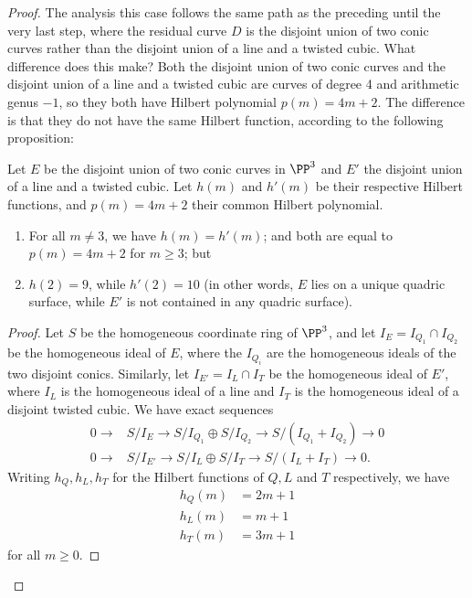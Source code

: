 \begin{proof}

The analysis this case follows the same path as the preceding until the very last step, where the residual curve $D$ is the disjoint union of two conic curves rather than the disjoint union of a line and a twisted cubic. What difference does this make? Both the disjoint union of two conic curves and the disjoint union of a line and a twisted cubic are curves of degree 4 and arithmetic genus $-1$, so they both have Hilbert polynomial $p(m) = 4m+2$. The difference is that they do not have the same Hilbert function, according to the following proposition:

\begin{proposition}\label{quartic curve postulation}
Let $E$ be the  disjoint union of two conic curves in $\PP^3$ and $E'$ the disjoint union of a line and a twisted cubic. Let $h(m)$ and $h'(m)$ be their respective Hilbert functions, and $p(m) = 4m+2$ their common Hilbert polynomial.
\begin{enumerate}
\item For all $m \neq 3$, we have $h(m) = h'(m)$; and both are equal to $p(m) = 4m+2$ for $m\geq 3$; but
\item $h(2) = 9$, while $h'(2) = 10$ (in other words, $E$ lies on a unique quadric surface, while $E'$ is not contained in any quadric surface).
\end{enumerate}
\end{proposition}

\begin{proof} 
Let $S$ be the homogeneous coordinate ring of $\PP^3$, and let
$I_E = I_{Q_1}\cap I_{Q_2}$ be the homogeneous ideal of $E$, where the $I_{Q_i}$ are the homogeneous
ideals of the two disjoint conics. Similarly, let $I_{E'} = I_L\cap I_T$ be the
homogeneous ideal of $E'$, where $I_L$ is the homogeneous ideal of a line and $I_T$ is the homogeneous ideal
of a disjoint twisted cubic. We have exact sequences
\begin{align*}
0\to &S/I_E \to S/I_{Q_1} \oplus S/I_{Q_2} \to S/(I_{Q_1}+I_{Q_2})\to 0\\
0\to &S/I_{E'} \to S/I_L \oplus S/I_T \to S/(I_L+I_T)\to 0.
\end{align*}
Writing $h_Q, h_L,h_T$ for the Hilbert functions of $Q,L$ and $T$ respectively, we have
\begin{align*}
h_Q(m) &= 2m+1\\
h_L(m) &= m+1\\
h_T(m) &=3m+1 
\end{align*}
for all $m\geq 0$. 


\end{proof}
\end{proof}
